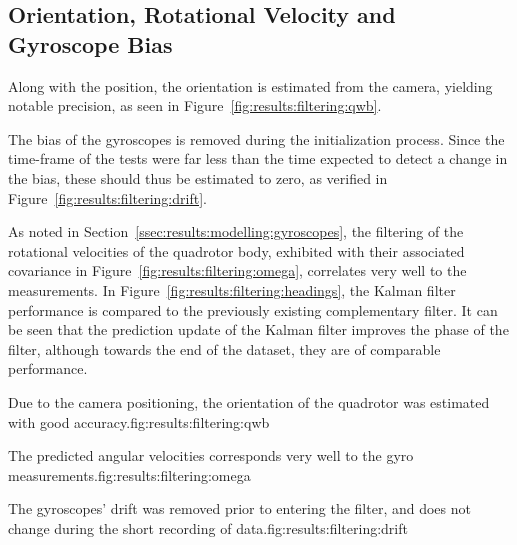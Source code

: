 \subsection{Orientation, Rotational Velocity and Gyroscope Bias}
    Along with the position, the orientation is estimated from the camera,
    yielding notable precision, as seen in Figure~\ref{fig:results:filtering:qwb}.

    The bias of the gyroscopes is removed during the initialization process.
    Since the time-frame of the tests were far less than the time expected to
    detect a change in the bias, these should thus be estimated to zero,
    as verified in Figure~\ref{fig:results:filtering:drift}.

    As noted in Section~\ref{ssec:results:modelling:gyroscopes}, the
    filtering of the rotational velocities of the quadrotor body,
    exhibited with their associated covariance in Figure~\ref{fig:results:filtering:omega},
    correlates very well to the measurements.
    In Figure~\ref{fig:results:filtering:headings}, the Kalman filter performance is compared
    to the previously existing complementary filter. It can be seen that
    the prediction update of the Kalman filter improves the phase of the filter,
    although towards the end of the dataset, they are of comparable performance.

    \begin{subfigures}{Due to the camera positioning, the orientation of the quadrotor was estimated with good accuracy.}{fig:results:filtering:qwb}
    \end{subfigures}

    \begin{subfigures}{The predicted angular velocities corresponds very well to the gyro measurements.}{fig:results:filtering:omega}
    \end{subfigures}

    \begin{subfigures}{The gyroscopes' drift was removed prior to entering the filter, and does not change during the short recording of data.}{fig:results:filtering:drift}
    \end{subfigures}

